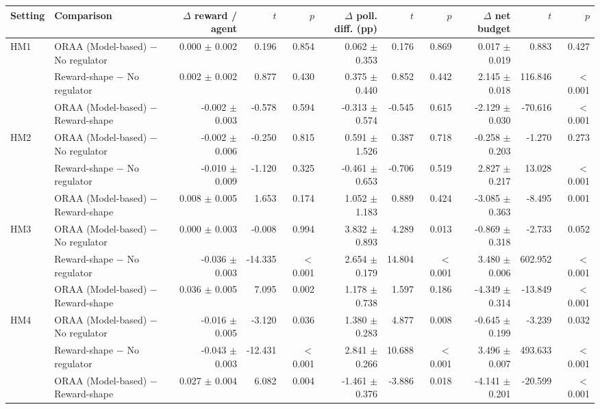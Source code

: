 \begin{tabular}{llrrrrrrrrr}
\toprule
Setting & Comparison & $\Delta$ reward / agent & $t$ & $p$ & $\Delta$ poll. diff. (pp) & $t$ & $p$ & $\Delta$ net budget & $t$ & $p$ \\
\midrule
HM1 & ORAA (Model-based) $-$ No regulator & 0.000 $\pm$ 0.002 & 0.196 & 0.854 & 0.062 $\pm$ 0.353 & 0.176 & 0.869 & 0.017 $\pm$ 0.019 & 0.883 & 0.427 \\
 & Reward-shape $-$ No regulator & 0.002 $\pm$ 0.002 & 0.877 & 0.430 & 0.375 $\pm$ 0.440 & 0.852 & 0.442 & 2.145 $\pm$ 0.018 & 116.846 & $<$0.001 \\
 & ORAA (Model-based) $-$ Reward-shape & -0.002 $\pm$ 0.003 & -0.578 & 0.594 & -0.313 $\pm$ 0.574 & -0.545 & 0.615 & -2.129 $\pm$ 0.030 & -70.616 & $<$0.001 \\
\addlinespace
HM2 & ORAA (Model-based) $-$ No regulator & -0.002 $\pm$ 0.006 & -0.250 & 0.815 & 0.591 $\pm$ 1.526 & 0.387 & 0.718 & -0.258 $\pm$ 0.203 & -1.270 & 0.273 \\
 & Reward-shape $-$ No regulator & -0.010 $\pm$ 0.009 & -1.120 & 0.325 & -0.461 $\pm$ 0.653 & -0.706 & 0.519 & 2.827 $\pm$ 0.217 & 13.028 & $<$0.001 \\
 & ORAA (Model-based) $-$ Reward-shape & 0.008 $\pm$ 0.005 & 1.653 & 0.174 & 1.052 $\pm$ 1.183 & 0.889 & 0.424 & -3.085 $\pm$ 0.363 & -8.495 & 0.001 \\
\addlinespace
HM3 & ORAA (Model-based) $-$ No regulator & 0.000 $\pm$ 0.003 & -0.008 & 0.994 & 3.832 $\pm$ 0.893 & 4.289 & 0.013 & -0.869 $\pm$ 0.318 & -2.733 & 0.052 \\
 & Reward-shape $-$ No regulator & -0.036 $\pm$ 0.003 & -14.335 & $<$0.001 & 2.654 $\pm$ 0.179 & 14.804 & $<$0.001 & 3.480 $\pm$ 0.006 & 602.952 & $<$0.001 \\
 & ORAA (Model-based) $-$ Reward-shape & 0.036 $\pm$ 0.005 & 7.095 & 0.002 & 1.178 $\pm$ 0.738 & 1.597 & 0.186 & -4.349 $\pm$ 0.314 & -13.849 & $<$0.001 \\
\addlinespace
HM4 & ORAA (Model-based) $-$ No regulator & -0.016 $\pm$ 0.005 & -3.120 & 0.036 & 1.380 $\pm$ 0.283 & 4.877 & 0.008 & -0.645 $\pm$ 0.199 & -3.239 & 0.032 \\
 & Reward-shape $-$ No regulator & -0.043 $\pm$ 0.003 & -12.431 & $<$0.001 & 2.841 $\pm$ 0.266 & 10.688 & $<$0.001 & 3.496 $\pm$ 0.007 & 493.633 & $<$0.001 \\
 & ORAA (Model-based) $-$ Reward-shape & 0.027 $\pm$ 0.004 & 6.082 & 0.004 & -1.461 $\pm$ 0.376 & -3.886 & 0.018 & -4.141 $\pm$ 0.201 & -20.599 & $<$0.001 \\

\end{tabular}
